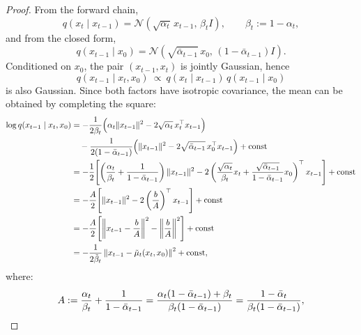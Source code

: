 \documentclass[../main]{subfiles}
\begin{document}
\begin{proof}
From the forward chain,
\begin{equation}
    q(x_t\mid x_{t-1})=\mathcal N(\sqrt{\alpha_t}\,x_{t-1},\,\beta_t I),\qquad \beta_t:=1-\alpha_t,
\end{equation}
and from the closed form,
\begin{equation}
    q(x_{t-1}\mid x_0)=\mathcal N(\sqrt{\bar\alpha_{t-1}}\,x_0,\,(1-\bar\alpha_{t-1})I).
\end{equation}
Conditioned on $x_0$, the pair $(x_{t-1},x_t)$ is jointly Gaussian, hence
\begin{equation}
    q(x_{t-1}\mid x_t,x_0)\ \propto\ q(x_t\mid x_{t-1})\,q(x_{t-1}\mid x_0)
\end{equation}
is also Gaussian. Since both factors have isotropic covariance, the mean can be obtained by
completing the square:
\begin{align}
    \log q(x_{t-1}\mid x_t,x_0)
    &= -\frac{1}{2\beta_t}
    \Bigl(
        \alpha_t \|x_{t-1}\|^2
        - 2\sqrt{\alpha_t}\,x_t^\top x_{t-1}
    \Bigr) \notag \\
    &\quad -\frac{1}{2(1-\bar\alpha_{t-1})}
    \Bigl(
        \|x_{t-1}\|^2
        - 2\sqrt{\bar\alpha_{t-1}}\,x_0^\top x_{t-1}
    \Bigr)
    + \mathrm{const} \notag \\
    &= -\frac{1}{2}
    \Biggl[
        \left(
            \frac{\alpha_t}{\beta_t}
            + \frac{1}{1-\bar\alpha_{t-1}}
        \right)\|x_{t-1}\|^2
        - 2
        \left(
            \frac{\sqrt{\alpha_t}}{\beta_t}x_t
            + \frac{\sqrt{\bar\alpha_{t-1}}}{1-\bar\alpha_{t-1}}x_0
        \right)^\top x_{t-1}
    \Biggr]
    + \mathrm{const} \notag \\
    &= -\frac{A}{2}
    \Biggl[
        \|x_{t-1}\|^2 - 2\left(\frac{b}{A}\right)^\top x_{t-1}
    \Biggr]
    + \mathrm{const} \notag \\
    &= -\frac{A}{2}\Biggl[
        \left\|x_{t-1}-\frac{b}{A}\right\|^2
        - \left\|\frac{b}{A}\right\|^2
    \Biggr]
    + \mathrm{const} \notag \\
    &= -\frac{1}{2\tilde\beta_t}\left\|x_{t-1}-\tilde\mu_t(x_t,x_0)\right\|^2+\mathrm{const},
\end{align}
where:
\begin{align}
    A &:= \frac{\alpha_t}{\beta_t}+\frac{1}{1-\bar\alpha_{t-1}}
    = \frac{\alpha_t(1-\bar\alpha_{t-1})+\beta_t}{\beta_t(1-\bar\alpha_{t-1})}
    = \frac{1-\bar\alpha_t}{\beta_t(1-\bar\alpha_{t-1})}, \notag\\

\end{align}
\end{proof}
\end{document}

